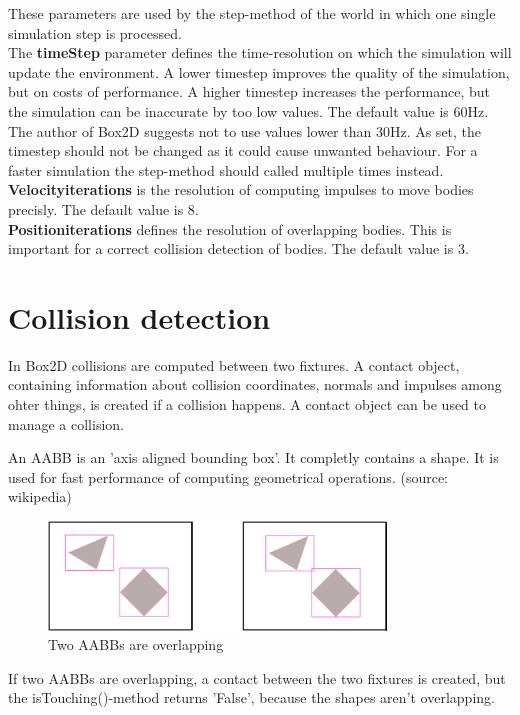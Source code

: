\documentclass[10pt,a4paper,DIV=11]{scrreprt}
\begin{document}
These parameters are used by the step-method of the world in which one single simulation step is processed. \\

The \textbf{timeStep} parameter defines the time-resolution on which the simulation will update the environment. A lower timestep improves the quality of the simulation, but on costs of performance. A higher timestep increases the performance, but the simulation can be inaccurate by too low values.
The default value is 60Hz. The author of Box2D suggests not to use values lower than 30Hz. As set, the timestep should not be changed as it could cause unwanted behaviour. For a faster simulation the step-method should called multiple times instead. \\


\textbf{Velocityiterations} is the resolution of computing impulses to move bodies precisly. The default value is 8. \\

\textbf{Positioniterations} defines the resolution of overlapping bodies. This is important for a correct collision detection of bodies. The default value is 3. \\

\cite{box}

\cite{iforce}


\section{Collision detection}
In Box2D collisions are computed between two fixtures. A contact object, containing information about collision coordinates, normals and impulses among ohter things, is created if a collision happens. A contact object can be used to manage a collision.

An AABB is an 'axis aligned bounding box'. It completly contains a shape. It is used for fast performance of computing geometrical operations. (source: wikipedia)

\begin{center}
	\begin{figure}[H]
		\centering
		\includegraphics[width=0.8\textwidth,scale=1.0]{files/aabbs-crossing.png}  
		\caption{Two AABBs are overlapping \cite{iforce}}
		\label{fig:aabbs}
	\end{figure}
\end{center}
If two AABBs are overlapping, a contact between the two fixtures is created, but the isTouching()-method returns 'False', because the shapes aren't overlapping.
\end{document}
